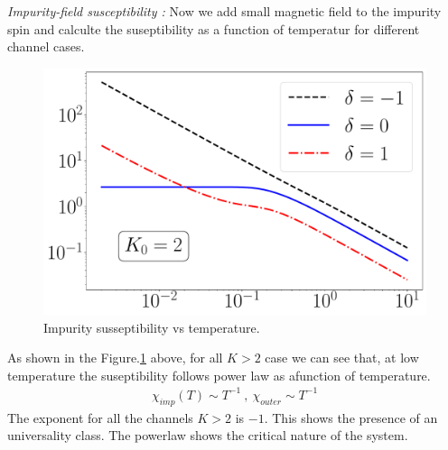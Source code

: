 \documentclass[reprint,prb,superscriptaddress]{revtex4-1}
\begin{document}
\textit{Impurity-field susceptibility :} Now we add small magnetic field to the impurity spin and calculte the suseptibility as a function of temperatur for different channel cases.
\begin{figure}
\centering
\includegraphics[scale=0.36]{plt/Central_Field_Chi_Powerlaw_}
\caption{Impurity susseptibility vs temperature.}
\label{fig:suseptibility_impurity}
\end{figure}
As shown in the Figure.\ref{fig:suseptibility_impurity} above, for all $K>2$ case we can see that, at low temperature the suseptibility follows power law as afunction of temperature. 
\begin{eqnarray}
\chi_{imp}(T) \sim T^{-1} ~,~ \chi_{outer} \sim T^{-1}
\end{eqnarray}
The exponent for all the channels $K>2$ is $-1$. This shows the presence of an universality class. The powerlaw shows the critical nature of the system.
\end{document}
